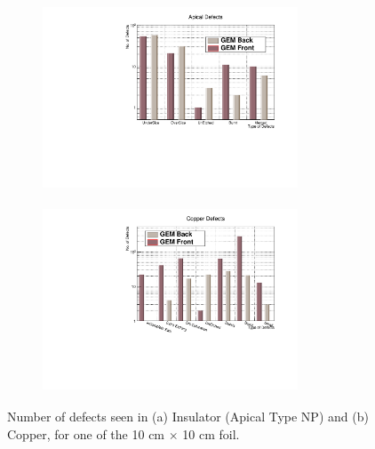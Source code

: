\begin{figure}[!htbp]
    \centering
    \begin{subfigure}[b]{0.49\textwidth}
        \includegraphics[width=7.6cm, height=5.5cm]{figures/GEM/figures/Apical_Defects.pdf}\qquad
        \caption{ }
        \label{fig:O_9a}
    \end{subfigure}
    \begin{subfigure}[b]{0.49\textwidth}
        \includegraphics[width=7.6cm, height=5.5cm]{figures/GEM/figures/CopperDefects.pdf}
        \caption{ }
        \label{fig:O_9b}
    \end{subfigure}
   \caption{Number of defects seen in (a) Insulator (Apical Type NP) and (b) Copper, for one of the 10 cm $\times$ 10 cm foil.} \label{fig:Optical_04}
\end{figure}


